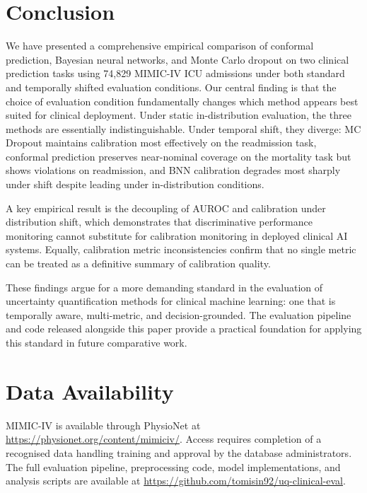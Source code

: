 \documentclass[11pt,a4paper]{article}
\begin{document}
\section{Conclusion}
\label{sec:conclusion}

We have presented a comprehensive empirical comparison of conformal prediction, Bayesian neural networks, and Monte Carlo dropout on two clinical prediction tasks using 74,829 MIMIC-IV ICU admissions under both standard and temporally shifted evaluation conditions. Our central finding is that the choice of evaluation condition fundamentally changes which method appears best suited for clinical deployment. Under static in-distribution evaluation, the three methods are essentially indistinguishable. Under temporal shift, they diverge: MC Dropout maintains calibration most effectively on the readmission task, conformal prediction preserves near-nominal coverage on the mortality task but shows violations on readmission, and BNN calibration degrades most sharply under shift despite leading under in-distribution conditions.

A key empirical result is the decoupling of AUROC and calibration under distribution shift, which demonstrates that discriminative performance monitoring cannot substitute for calibration monitoring in deployed clinical AI systems. Equally, calibration metric inconsistencies confirm that no single metric can be treated as a definitive summary of calibration quality.

These findings argue for a more demanding standard in the evaluation of uncertainty quantification methods for clinical machine learning: one that is temporally aware, multi-metric, and decision-grounded. The evaluation pipeline and code released alongside this paper provide a practical foundation for applying this standard in future comparative work.

\section*{Data Availability}
MIMIC-IV is available through PhysioNet \citep{goldberger2000} at \url{https://physionet.org/content/mimiciv/}. Access requires completion of a recognised data handling training and approval by the database administrators. The full evaluation pipeline, preprocessing code, model implementations, and analysis scripts are available at \url{https://github.com/tomisin92/uq-clinical-eval}.
\end{document}
